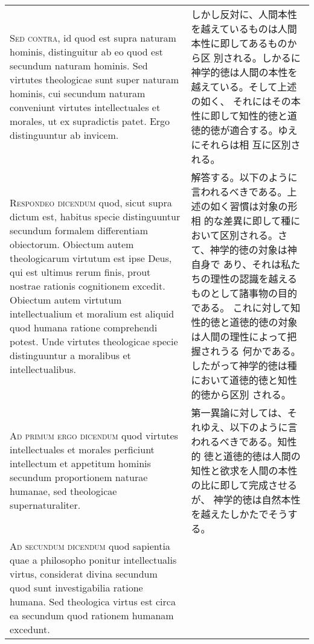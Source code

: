 \documentclass[10pt]{jsarticle}
\begin{document}
\begin{longtable}{p{21em}p{21em}}
\\

{\scshape Sed contra}, id quod est supra naturam hominis, distinguitur
ab eo quod est secundum naturam hominis. Sed virtutes theologicae sunt
super naturam hominis, cui secundum naturam conveniunt virtutes
intellectuales et morales, ut ex supradictis patet. Ergo distinguuntur
ab invicem.

&

しかし反対に、人間本性を越えているものは人間本性に即してあるものから区
別される。しかるに神学的徳は人間の本性を越えている。そして上述の如く、
それにはその本性に即して知性的徳と道徳的徳が適合する。ゆえにそれらは相
互に区別される。
 
\\


{\scshape Respondeo dicendum} quod, sicut supra dictum est, habitus
specie distinguuntur secundum formalem differentiam
obiectorum. Obiectum autem theologicarum virtutum est ipse Deus, qui
est ultimus rerum finis, prout nostrae rationis cognitionem
excedit. Obiectum autem virtutum intellectualium et moralium est
aliquid quod humana ratione comprehendi potest. Unde virtutes
theologicae specie distinguuntur a moralibus et intellectualibus.


&

 解答する。以下のように言われるべきである。上述の如く習慣は対象の形相
 的な差異に即して種において区別される。さて、神学的徳の対象は神自身で
 あり、それは私たちの理性の認識を越えるものとして諸事物の目的である。
 これに対して知性的徳と道徳的徳の対象は人間の理性によって把握されうる
 何かである。したがって神学的徳は種において道徳的徳と知性的徳から区別
 される。
 
 
\\



{\scshape Ad primum ergo dicendum} quod virtutes intellectuales et
morales perficiunt intellectum et appetitum hominis secundum
proportionem naturae humanae, sed theologicae supernaturaliter.


&

 第一異論に対しては、それゆえ、以下のように言われるべきである。知性的
 徳と道徳的徳は人間の知性と欲求を人間の本性の比に即して完成させるが、
 神学的徳は自然本性を越えたしかたでそうする。
 
\\



{\scshape Ad secundum dicendum} quod sapientia quae a philosopho
ponitur intellectualis virtus, considerat divina secundum quod sunt
investigabilia ratione humana. Sed theologica virtus est circa ea
secundum quod rationem humanam excedunt.



\end{longtable}
\end{document}
